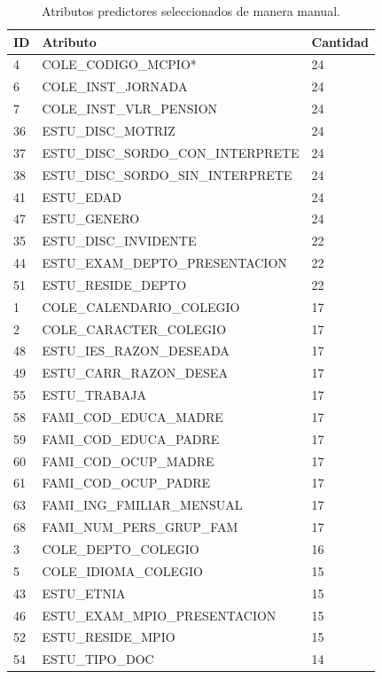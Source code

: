 \begin{table}[!Hhtb]
\centering
\begin{tabular}{|p{0.5cm}|p{8cm}|p{1.8cm}|}
\hline
	\rowcolor[gray]{0.9} 
	\textbf{ID} &
	\textbf{Atributo} &
	\textbf{Cantidad}\\
\hline
4 & COLE_CODIGO_MCPIO* & 24 \\ \hline
6 & COLE\_INST\_JORNADA & 24 \\ \hline
7 & COLE\_INST\_VLR\_PENSION & 24 \\ \hline
36 & ESTU\_DISC\_MOTRIZ & 24 \\ \hline
37 & ESTU\_DISC\_SORDO\_CON\_INTERPRETE & 24 \\ \hline
38 & ESTU\_DISC\_SORDO\_SIN\_INTERPRETE & 24 \\ \hline
41 & ESTU\_EDAD & 24 \\ \hline
47 & ESTU\_GENERO & 24 \\ \hline
35 & ESTU\_DISC\_INVIDENTE & 22 \\ \hline
44 & ESTU\_EXAM\_DEPTO\_PRESENTACION & 22 \\ \hline
51 & ESTU\_RESIDE\_DEPTO & 22 \\ \hline
1 & COLE\_CALENDARIO\_COLEGIO & 17 \\ \hline
2 & COLE\_CARACTER\_COLEGIO & 17 \\ \hline
48 & ESTU\_IES\_RAZON\_DESEADA & 17 \\ \hline
49 & ESTU\_CARR\_RAZON\_DESEA & 17 \\ \hline
55 & ESTU\_TRABAJA & 17 \\ \hline
58 & FAMI\_COD\_EDUCA\_MADRE & 17 \\ \hline
59 & FAMI\_COD\_EDUCA\_PADRE & 17 \\ \hline
60 & FAMI\_COD\_OCUP\_MADRE & 17 \\ \hline
61 & FAMI\_COD\_OCUP\_PADRE & 17 \\ \hline
63 & FAMI\_ING\_FMILIAR\_MENSUAL & 17 \\ \hline
68 & FAMI\_NUM\_PERS\_GRUP\_FAM & 17 \\ \hline
3 & COLE\_DEPTO\_COLEGIO & 16 \\ \hline
5 & COLE\_IDIOMA\_COLEGIO & 15 \\ \hline
43 & ESTU\_ETNIA & 15 \\ \hline
46 & ESTU\_EXAM\_MPIO\_PRESENTACION & 15 \\ \hline
52 & ESTU\_RESIDE\_MPIO & 15 \\ \hline
54 & ESTU\_TIPO\_DOC & 14 \\ \hline
\end{tabular}
\caption{Atributos predictores seleccionados de manera manual.}
\label{tab:cuadro15}
\end{table}
